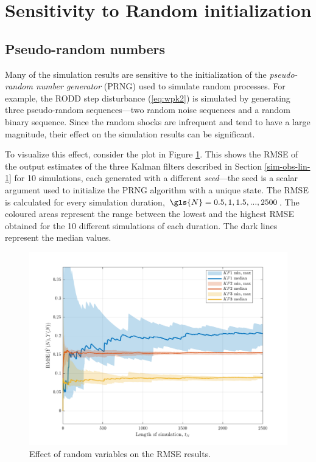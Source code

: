 \section{Sensitivity to Random initialization} \label{sec:random-init}

\subsection{Pseudo-random numbers}

Many of the simulation results are sensitive to the initialization of the \textit{pseudo-random number generator} (\gls{PRNG}) used to simulate random processes. For example, the \gls{RODD} step disturbance (\ref{eq:wpk2}) is simulated by generating three pseudo-random sequences---two random noise sequences and a random binary sequence. Since the random shocks are infrequent and tend to have a large magnitude, their effect on the simulation results can be significant.

To visualize this effect, consider the plot in Figure \ref{fig:rod-obs-sim-1-3KF-seed-crmse-statsplot}. This shows the \gls{RMSE} of the output estimates of the three Kalman filters described in Section \ref{sim-obs-lin-1} for 10 simulations, each generated with a different \textit{seed}—the seed is a scalar argument used to initialize the \gls{PRNG} algorithm with a unique state. The \gls{RMSE} is calculated for every simulation duration, $\gls{N}=0.5,1,1.5,...,2500$. The coloured areas represent the range between the lowest and the highest \gls{RMSE} obtained for the 10 different simulations of each duration. The dark lines represent the median values.

\begin{figure}[htp]
	\centering
	\includegraphics[width=14cm]{images/rod_obs_sim1_3KF_seed_crmse_statsplot.pdf}
	\caption{Effect of random variables on the \gls{RMSE} results.}
	\label{fig:rod-obs-sim-1-3KF-seed-crmse-statsplot}
\end{figure}  %

